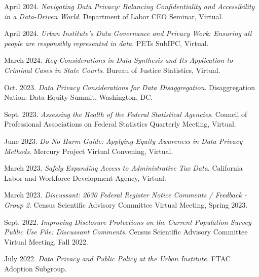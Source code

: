 \begin{etaremune}[topsep=0pt, itemsep=4pt, partopsep=0pt, parsep=0pt]
    \item April 2024. \textit{Navigating Data Privacy: Balancing Confidentiality and Accessibility in a Data-Driven World}. Department of Labor CEO Seminar, Virtual.
    
    \item April 2024. \textit{Urban Institute's Data Governance and Privacy Work: Ensuring all people are responsibly represented in data}. PETs SubIPC, Virtual.

    \item March 2024. \textit{Key Considerations in Data Synthesis and Its Application to Criminal Cases in State Courts}. Bureau of Justice Statistics, Virtual.
    
    \item Oct. 2023. \textit{Data Privacy Considerations for Data Disaggregation}. Disaggregation Nation: Data Equity Summit, Washington, DC.
    
    \item Sept. 2023. \textit{Assessing the Health of the Federal Statistical Agencies}. Council of Professional Associations on Federal Statistics Quarterly Meeting, Virtual.

    \item June 2023. \textit{Do No Harm Guide: Applying Equity Awareness in Data Privacy Methods}. Mercury Project Virtual Convening, Virtual.
    
    \item March 2023. \textit{Safely Expanding Access to Administrative Tax Data}. California Labor and Workforce Development Agency, Virtual.
    
    \item March 2023. \textit{Discussant: 2030 Federal Register Notice Comments / Feedback - Group 2}. Census Scientific Advisory Committee Virtual Meeting, Spring 2023.
    
    \item Sept. 2022. \textit{Improving Disclosure Protections on the Current Population Survey Public Use File: Discussant Comments}. Census Scientific Advisory Committee Virtual Meeting, Fall 2022.
    
    \item July 2022. \textit{Data Privacy and Public Policy at the Urban Institute.} FTAC Adoption Subgroup.
    

\end{etaremune}

